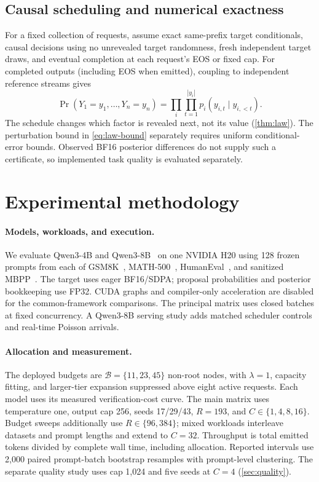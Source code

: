 \documentclass{article}
\begin{document}
\subsection{Causal scheduling and numerical exactness}
\label{sec:law}
For a fixed collection of requests, assume exact same-prefix target conditionals, causal decisions using no unrevealed target randomness, fresh independent target draws, and eventual completion at each request's EOS or fixed cap. For completed outputs (including EOS when emitted), coupling to independent reference streams gives
\begin{equation}
\Pr(Y_1=y_1,\ldots,Y_n=y_n)=\prod_i\prod_{t=1}^{|y_i|}p_i(y_{i,t}\mid y_{i,<t}).
\label{eq:main-sequence-factorization}
\end{equation}
The schedule changes which factor is revealed next, not its value (\cref{thm:law}). The perturbation bound in \cref{eq:law-bound} separately requires uniform conditional-error bounds. Observed BF16 posterior differences do not supply such a certificate, so implemented task quality is evaluated separately.

\section{Experimental methodology}
\label{sec:methodology}
\paragraph{Models, workloads, and execution.}
We evaluate Qwen3-4B and Qwen3-8B~\citep{yang2025qwen3} on one NVIDIA H20 using 128 frozen prompts from each of GSM8K~\citep{cobbe2021gsm8k}, MATH-500~\citep{hendrycks2021math}, HumanEval~\citep{chen2021humaneval}, and sanitized MBPP~\citep{austin2021mbpp}. The target uses eager BF16/SDPA; proposal probabilities and posterior bookkeeping use FP32. CUDA graphs and compiler-only acceleration are disabled for the common-framework comparisons. The principal matrix uses closed batches at fixed concurrency. A Qwen3-8B serving study adds matched scheduler controls and real-time Poisson arrivals.

\paragraph{Allocation and measurement.}
The deployed budgets are $\mathcal B=\{11,23,45\}$ non-root nodes, with $\lambda=1$, capacity fitting, and larger-tier expansion suppressed above eight active requests. Each model uses its measured verification-cost curve. The main matrix uses temperature one, output cap 256, seeds 17/29/43, $R=193$, and $C\in\{1,4,8,16\}$. Budget sweeps additionally use $R\in\{96,384\}$; mixed workloads interleave datasets and prompt lengths and extend to $C=32$. Throughput is total emitted tokens divided by complete wall time, including allocation. Reported intervals use 2,000 paired prompt-batch bootstrap resamples with prompt-level clustering. The separate quality study uses cap 1,024 and five seeds at $C=4$ (\cref{sec:quality}).
\end{document}
